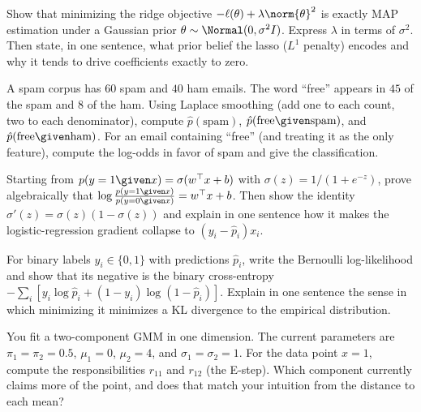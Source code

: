 \begin{exercise}
Show that minimizing the ridge objective
$-\ell(\theta) + \lambda\norm{\theta}^2$ is exactly MAP estimation under a
Gaussian prior $\theta\sim\Normal(0,\sigma^2 I)$. Express $\lambda$ in terms of
$\sigma^2$. Then state, in one sentence, what prior belief the lasso ($L^1$
penalty) encodes and why it tends to drive coefficients exactly to zero.
\end{exercise}

\begin{exercise}
A spam corpus has $60$ spam and $40$ ham emails. The word ``free'' appears in
$45$ of the spam and $8$ of the ham. Using Laplace smoothing (add one to each
count, two to each denominator), compute $\hat p(\text{spam})$,
$\hat p(\text{free}\given\text{spam})$, and
$\hat p(\text{free}\given\text{ham})$. For an email containing ``free'' (and
treating it as the only feature), compute the log-odds in favor of spam and give
the classification.
\end{exercise}

\begin{exercise}
Starting from $p(y=1\given x) = \sigma(w^\top x + b)$ with
$\sigma(z) = 1/(1+e^{-z})$, prove algebraically that
$\log\frac{p(y=1\given x)}{p(y=0\given x)} = w^\top x + b$. Then show the identity
$\sigma'(z) = \sigma(z)(1-\sigma(z))$ and explain in one sentence how it makes the
logistic-regression gradient collapse to $(y_i - \hat p_i)x_i$.
\end{exercise}

\begin{exercise}
For binary labels $y_i\in\{0,1\}$ with predictions $\hat p_i$, write the Bernoulli
log-likelihood and show that its negative is the binary cross-entropy
$-\sum_i[y_i\log\hat p_i + (1-y_i)\log(1-\hat p_i)]$. Explain in one sentence
the sense in which minimizing it minimizes a KL divergence to the empirical
distribution.
\end{exercise}

\begin{exercise}
You fit a two-component GMM in one dimension. The current parameters are
$\pi_1=\pi_2=0.5$, $\mu_1=0$, $\mu_2=4$, and $\sigma_1=\sigma_2=1$. For the data
point $x=1$, compute the responsibilities $r_{11}$ and $r_{12}$ (the E-step).
Which component currently claims more of the point, and does that match your
intuition from the distance to each mean?
\end{exercise}

